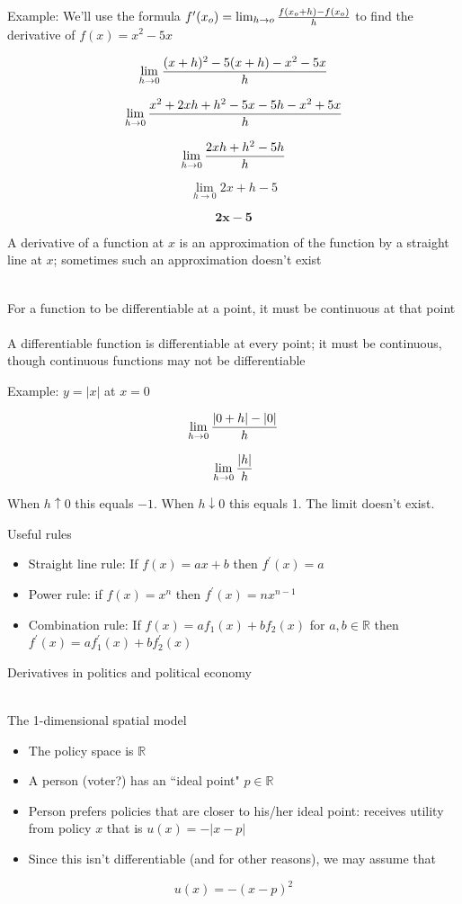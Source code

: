 \documentclass[10pt]{seminar}
\begin{document}
\begin{slide}
\newslide

Example: We'll use the formula $f^\prime(x_o)=\lim_{h\rightarrow o}{{f(x_o+h)-f(x_o)}\over{h}}$ to find the derivative of $f(x)=x^2-5x$

$$\lim_{h\rightarrow 0} {{(x+h)^2-5(x+h)-x^2-5x}\over{h}}$$

$$\lim_{h\rightarrow 0} {{x^2+2xh+h^2-5x-5h-x^2+5x}\over{h}}$$

$$\lim_{h\rightarrow 0} {{2xh+h^2-5h}\over{h}}$$

$$\lim_{h\rightarrow 0} {{2x+h-5}}$$

$$\mathbf{2x-5}$$

\newslide

A derivative of a function at $x$ is an approximation of the function by a straight line at $x$; sometimes such an approximation doesn't exist

\ \\For a function to be differentiable at a point, it must be continuous at that point
\ \\A differentiable function is differentiable at every point; it must be continuous, though continuous functions may not be differentiable

Example: $y=|x|$ at $x=0$

$$\lim_{h\rightarrow 0}{{|0+h|-|0|}\over{h}}$$

$$\lim_{h\rightarrow 0}{{|h|}\over{h}}$$

When $h\uparrow 0$ this equals $-1$.  When $h\downarrow 0$ this equals 1. The limit doesn't exist.

\newslide Useful rules

\begin{itemize}
\item Straight line rule: If $f(x)=ax+b  $ then $f^\prime(x)=a$

\item Power rule: if $f(x)=x^n$ then $f^\prime(x)=n x ^{n-1}$

\item Combination rule:  If $f(x)=a f_1(x)+b f_2(x)$ for $a, b\in \mathbb{R}$ then $f^\prime(x)=a f_1^\prime(x) +b f_2^\prime(x)$

 \end{itemize}

\newslide

Derivatives in politics and political economy

\ \\The 1-dimensional spatial model

\begin{itemize}
\item The policy space is $\mathbb{R}$
\item A person (voter?)  has an ``ideal point" $p\in \mathbb{R}$
\item Person prefers policies that are closer to his/her ideal point: receives utility  from policy $x$ that is $u(x)=-|x-p|$
\item Since this isn't differentiable (and for other reasons), we may assume that 
\end{itemize}
$$u(x)=-(x-p)^2$$


\end{slide}
\end{document}
